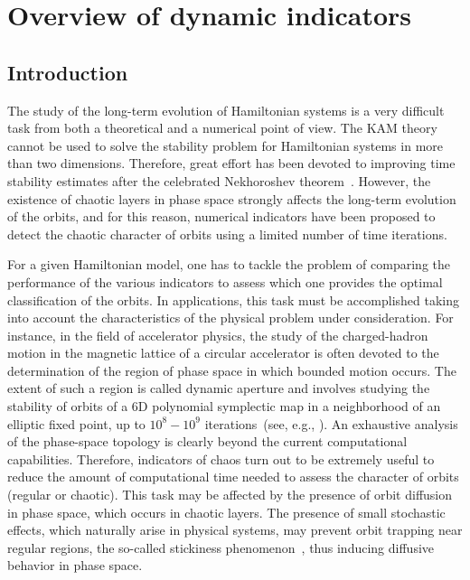 \chapter{Overview of dynamic indicators}

\section{\label{sec:dyn:intro}Introduction}
%
The study of the long-term evolution of Hamiltonian systems is a very difficult task from both a theoretical and a numerical point of view. The KAM theory\cite{KAM4} cannot be used to solve the stability problem for Hamiltonian systems in more than two dimensions. Therefore, great effort has been devoted to improving time stability estimates after the celebrated Nekhoroshev theorem~\cite{Nekhoroshev:1977aa}. However, the existence of chaotic layers in phase space strongly affects the long-term evolution of the orbits, and for this reason, numerical indicators have been proposed to detect the chaotic character of orbits using a limited number of time iterations. 

For a given Hamiltonian model, one has to tackle the problem of comparing the performance of the various indicators to assess which one provides the optimal classification of the orbits. In applications, this task must be accomplished taking into account the characteristics of the physical problem under consideration. For instance, in the field of accelerator physics, the study of the charged-hadron motion in the magnetic lattice of a circular accelerator is often devoted to the determination of the region of phase space in which bounded motion occurs. The extent of such a region is called dynamic aperture and involves studying the stability of orbits of a 6D polynomial symplectic map in a neighborhood of an elliptic fixed point, up to $10^8-10^9$ iterations~(see, e.g., \cite{Bazzani:262179}). An exhaustive analysis of the phase-space topology is clearly beyond the current computational capabilities. Therefore, indicators of chaos turn out to be extremely useful to reduce the amount of computational time needed to assess the character of orbits (regular or chaotic). This task may be affected by the presence of orbit diffusion in phase space, which occurs in chaotic layers. The presence of small stochastic effects, which naturally arise in physical systems, may prevent orbit trapping near regular regions, the so-called stickiness phenomenon~\cite{Kandrup1999DiffusionAS,SZEZECH2005394}, thus inducing diffusive behavior in phase space. 

